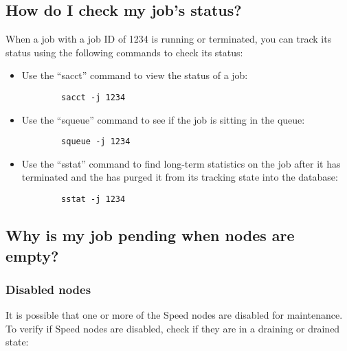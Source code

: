 \subsection{How do I check my job's status?}
\label{sect:faq-job-status}

When a job with a job ID of 1234 is running or terminated, you can track its status using the following commands to check its status:
\begin{itemize}
	\item Use the ``sacct'' command to view the status of a job:
	\begin{verbatim}
		sacct -j 1234
	\end{verbatim}
	\item Use the ``squeue'' command to see if the job is sitting in the queue:
	\begin{verbatim}
		squeue -j 1234
	\end{verbatim}
	\item Use the ``sstat'' command to find long-term statistics on the job after it has terminated
	and the  has purged it from its tracking state into the database:
	\begin{verbatim}
		sstat -j 1234
	\end{verbatim}
\end{itemize}

\subsection{Why is my job pending when nodes are empty?}

\subsubsection{Disabled nodes}
It is possible that one or more of the Speed nodes are disabled for maintenance.
To verify if Speed nodes are disabled, check if they are in a draining or drained state:


